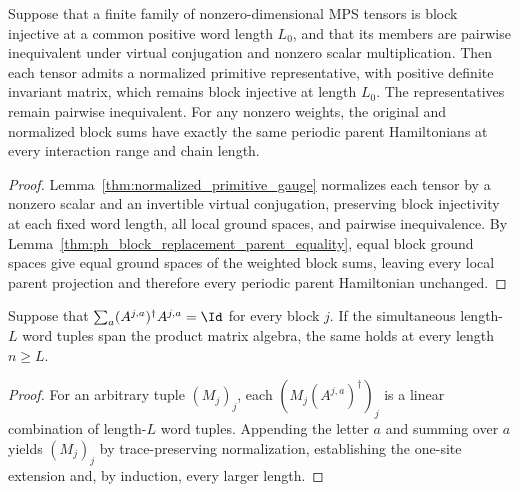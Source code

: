 \begin{lemma}
    \label{lem:normal-block-primitive-c1-normalization}
    \leanok
    Suppose that a finite family of nonzero-dimensional MPS tensors is
    block injective at a common positive word length $L_0$, and that its members
    are pairwise inequivalent under virtual conjugation and nonzero scalar
    multiplication. Then each tensor admits a normalized primitive
    representative, with positive definite invariant matrix, which remains
    block injective at length $L_0$.
    The representatives remain pairwise inequivalent. For any nonzero
    weights, the original and normalized block sums have exactly the same
    periodic parent Hamiltonians at every interaction range and chain length.
\end{lemma}
\begin{proof}
    \leanok
    Lemma~\ref{thm:normalized_primitive_gauge} normalizes each tensor by
    a nonzero scalar and an invertible virtual conjugation, preserving
    block injectivity at each fixed word length, all local ground spaces, and
    pairwise inequivalence. By
    Lemma~\ref{thm:ph_block_replacement_parent_equality}, equal block
    ground spaces give equal ground spaces of the weighted block sums, leaving
    every local parent projection and therefore every periodic parent
    Hamiltonian unchanged.
\end{proof}

\begin{lemma}
    \label{thm:ph_tp_word_span_propagation}
    \leanok
    Suppose that $\sum_a(A^{j,a})^\dagger A^{j,a}=\Id$ for every block $j$.
    If the simultaneous length-$L$ word tuples span the product matrix
    algebra, the same holds at every length $n\ge L$.
\end{lemma}
\begin{proof}
    \leanok
    For an arbitrary tuple $(M_j)_j$, each
    $(M_j(A^{j,a})^\dagger)_j$ is a linear combination of length-$L$ word
    tuples. Appending the letter $a$ and summing over $a$ yields
    $(M_j)_j$ by trace-preserving normalization, establishing the one-site
    extension and, by induction, every larger length.
\end{proof}

